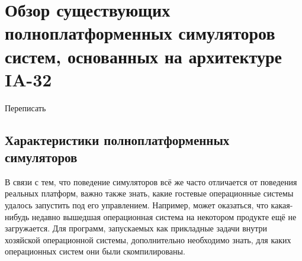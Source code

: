 \chapter[Обзор существующих полноплатформенных симуляторов]{Обзор существующих полноплатформенных симуляторов систем, основанных на архитектуре IA-32}\label{chapter02}


\todo Переписать




\section{Характеристики полноплатформенных симуляторов}

В связи с тем, что поведение симуляторов всё же часто отличается от поведения реальных платформ, важно также знать, какие гостевые операционные системы удалось запустить под его управлением. Например, может оказаться, что какая-нибудь недавно вышедшая операционная система на некотором продукте ещё не загружается. Для программ, запускаемых как прикладные задачи внутри хозяйской операционной системы, дополнительно необходимо знать, для каких операционных систем они были скомпилированы. 

